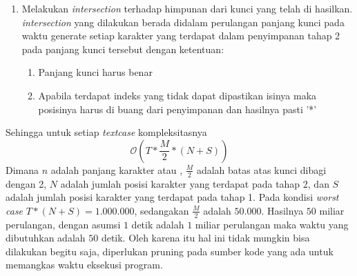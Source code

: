 \begin{enumerate}
	\item Melakukan \textit{intersection} terhadap himpunan dari kunci yang telah di hasilkan\cite{john_jones_spoj_2009}. \textit{intersection} yang dilakukan berada didalam perulangan panjang kunci pada waktu generate setiap karakter yang terdapat dalam penyimpanan tahap 2 pada panjang kunci tersebut dengan ketentuan:
	\begin{enumerate}
	\item Panjang kunci harus benar
	\item Apabila terdapat indeks yang tidak dapat dipastikan isinya maka posisinya harus di buang dari penyimpanan dan hasilnya pasti '*'
	\end{enumerate}
	\end{enumerate}
	Sehingga untuk setiap \textit{textcase} kompleksitasnya 
	$$\mathcal{O}(T*\frac{M}{2}*(N+S))$$ 
	Dimana $n$ adalah panjang karakter \plaintext atau \ciphertext , $\frac{M}{2}$ adalah batas atas kunci dibagi dengan 2, $N$ adalah jumlah posisi karakter yang terdapat pada tahap 2, dan $S$ adalah jumlah posisi karakter yang terdapat pada tahap 1. Pada kondisi \textit{worst case} $T*(N+S)=1.000.000$, sedangakan $\frac{M}{2}$ adalah $50.000$. Hasilnya $50$ miliar perulangan, dengan asumsi $1$ detik adalah $1$ miliar perulangan maka waktu yang dibutuhkan adalah $50$ detik. Oleh karena itu hal ini tidak mungkin bisa dilakukan begitu saja, diperlukan pruning pada sumber kode yang ada untuk memangkas waktu eksekusi program.